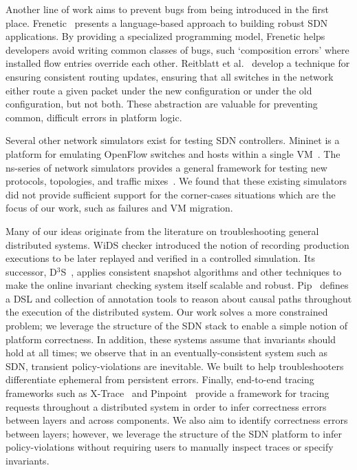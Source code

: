 Another line of work aims to prevent bugs from being introduced in the first
place. Frenetic~\cite{frenetic} presents a language-based approach to building
robust SDN applications. By providing a specialized programming model,
 Frenetic helps developers avoid writing common classes of
bugs, such `composition errors' where installed flow entries override each other.
Reitblatt et al.~\cite{consistentupdates} develop a technique for ensuring
consistent routing updates, ensuring that all switches in the network either route
a given packet under the new configuration or under the old configuration,
but not both. These abstraction are valuable for preventing common, difficult errors
in platform logic.

Several other network simulators exist for testing SDN controllers. Mininet is a 
platform for emulating OpenFlow switches and hosts within a single
 VM~\cite{Lantz:2010:NLR:1868447.1868466}. The ns-series of network simulators
provides a general framework for testing new protocols, topologies,
and traffic mixes~\cite{ns3}. We found that these existing simulators did
not provide sufficient support for the corner-cases situations which are the
focus of our work, such as failures and VM migration.


Many of our ideas originate from the literature on troubleshooting general
distributed systems. WiDS checker introduced the notion of recording
production executions to be later replayed and verified in a controlled simulation.
Its successor, D$^3$S~\cite{d3s}, applies consistent snapshot algorithms and
other techniques to make the online invariant checking system itself scalable
and robust. Pip~\cite{pip} defines a DSL and collection of annotation tools to
reason about causal paths throughout the execution of the
distributed system. Our work solves a more constrained problem; we leverage
the structure of the SDN stack to enable a simple notion of platform
correctness. In addition, these systems assume that invariants should hold at
all times; we observe that in an eventually-consistent system such as SDN,
transient policy-violations are inevitable. We built \simulator{} to help troubleshooters
differentiate ephemeral from persistent errors. Finally, end-to-end tracing
frameworks such as X-Trace~\cite{Fonseca:2007:XPN:1973430.1973450} and 
Pinpoint~\cite{Chen02pinpoint:problem} provide a framework for tracing requests throughout 
a distributed system in order to infer correctness errors between layers and
across components. We also aim to identify correctness errors between layers; however, we leverage the structure
of the SDN platform to infer policy-violations without requiring users to
manually inspect traces or specify invariants.


